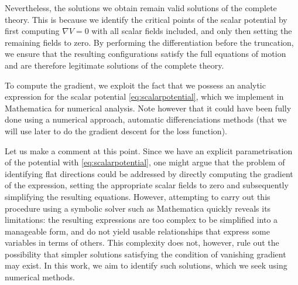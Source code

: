 \documentclass[11pt]{article}
\begin{document}
Nevertheless, the solutions we obtain remain valid solutions of the complete theory. This is because we identify the critical points of the scalar potential by first computing $\nabla V = 0$ with all scalar fields included, and only then setting the remaining fields to zero. By performing the differentiation before the truncation, we ensure that the resulting configurations satisfy the full equations of motion and are therefore legitimate solutions of the complete theory.

To compute the gradient, we exploit the fact that we possess an analytic expression for the scalar potential \eqref{eq:scalarpotential}, which we implement in Mathematica for numerical analysis. Note however that it could have been fully done using a numerical approach, automatic differenciations methods (that we will use later to do the gradient descent for the loss function).

Let us make a comment at this point. Since we have an explicit parametrisation of the potential with \eqref{eq:scalarpotential}, one might argue that the problem of identifying flat directions could be addressed by directly computing the gradient of the expression, setting the appropriate scalar fields to zero and subsequently simplifying the resulting equations. However, attempting to carry out this procedure using a symbolic solver such as Mathematica quickly reveals its limitations: the resulting expressions are too complex to be simplified into a manageable form, and do not yield usable relationships that express some variables in terms of others. This complexity does not, however, rule out the possibility that simpler solutions satisfying the condition of vanishing gradient may exist. In this work, we aim to identify such solutions, which we seek using numerical methods. 
\end{document}
